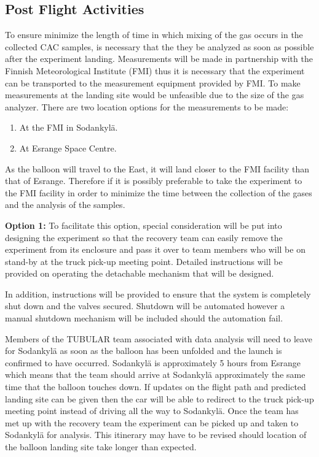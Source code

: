 \documentclass[a4paper,12pt,twoside]{article}
\begin{document}
\subsection{Post Flight Activities}

To ensure minimize the length of time in which mixing of the gas occurs in the collected CAC samples, is necessary that the they  be analyzed as soon as possible after the experiment landing. Measurements will be made in partnership with the Finnish Meteorological Institute (FMI) thus it is necessary that the experiment can be transported to the measurement equipment provided by FMI. To make measurements at the landing site would be unfeasible due to the size of the gas analyzer. There are two location options for the measurements to be made:

\begin{enumerate}
    \item At the FMI in Sodankylä.
    \item At Esrange Space Centre.
\end{enumerate}

As the balloon will travel to the East, it will land closer to the FMI facility than that of Esrange. Therefore if it is possibly preferable to take the experiment to the FMI facility in order to minimize the time between the collection of the gases and the analysis of the samples. 

\textbf{Option 1:}
To facilitate this option, special consideration will be put into designing the experiment so that the recovery team can easily remove the experiment from its enclosure and pass it over to team members who will be on stand-by at the truck pick-up meeting point. Detailed instructions will be provided on operating the detachable mechanism that will be designed. 

In addition, instructions will be provided to ensure that the system is completely shut down and the valves secured. Shutdown will be automated however a manual shutdown mechanism will be included should the automation fail.

Members of the TUBULAR team associated with data analysis will need to leave for Sodankylä as soon as the balloon has been unfolded and the launch is confirmed to have occurred. Sodankylä is approximately 5 hours from Esrange which means that the team should arrive at Sodankylä approximately the same time that the balloon touches down. If updates on the flight path and predicted landing site can be given then the car will be able to redirect to the truck pick-up meeting point instead of driving all the way to Sodankylä. Once the team has met up with the recovery team the experiment can be picked up and taken to Sodankylä for analysis. This itinerary may have to be revised should location of the balloon landing site take longer than expected.
\end{document}
